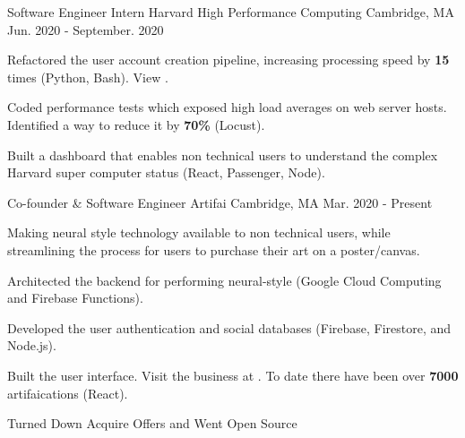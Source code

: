\begin{cventries}
  \cventry
    {Software Engineer Intern} %
    {Harvard High Performance Computing} %
    {Cambridge, MA} %
    {Jun. 2020 - September. 2020} %
    {
      \begin{cvitems} %
      \item {Refactored the user account creation pipeline, increasing processing speed by \textbf{15} times (Python, Bash). View .} 
      \item {Coded performance tests which exposed high load averages on web server hosts. Identified a way to reduce it by \textbf{70\%} (Locust).}
      \item {Built a dashboard that enables non technical users to understand the complex Harvard super computer status (React, Passenger, Node).}
      \end{cvitems}
    }

  \cventry
    {Co-founder \& Software Engineer} %
    {Artifai} %
    {Cambridge, MA} %
    {Mar. 2020 - Present} %
    {
      \begin{cvitems} %
      \item {Making neural style technology available to non technical users, while streamlining the process for users to purchase their art on a poster/canvas.}
      \item {Architected the backend for performing neural-style (Google Cloud Computing and Firebase Functions).}
      \item {Developed the user authentication and social databases (Firebase, Firestore, and Node.js).}
      \item {Built the user interface. Visit the business at . To date there have been over \textbf{7000} artifaications (React).}
      \item {Turned Down Acquire Offers and Went Open Source}
      \end{cvitems}
    }


\end{cventries}
